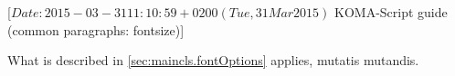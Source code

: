 %
%
%
%
%
%
%
%
% 
%
%
%
%

                 [$Date: 2015-03-31 11:10:59 +0200 (Tue, 31 Mar 2015) $
                  KOMA-Script guide (common paragraphs: fontsize)]


\makeatletter
{}%
%
%
%
\makeatother


\ifshortversion\IgnoreThisfalse{}\fi%
\ifIgnoreThis %
What is described in \autoref{sec:maincls.fontOptions} applies, mutatis mutandis.
\else %


